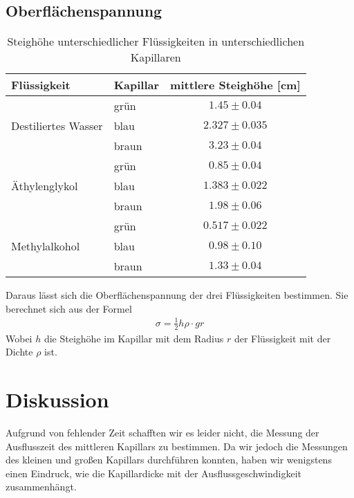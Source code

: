 \documentclass[12pt,a4paper,titlepage,headinclude,bibtotoc]{scrartcl}
\begin{document}
\subsection{Oberflächenspannung}
\begin{table}[!h]
\centering
\begin{tabular}{|l|l|c|}
\hline
Flüssigkeit 		& Kapillar & mittlere Steighöhe [cm]\\\hline\hline
			&grün	& $1.45\pm 0.04$\\
Destiliertes Wasser	&blau	& $2.327\pm 0.035$\\
                        &braun  & $3.23\pm 0.04$\\
\hline
			&grün	& $0.85\pm 0.04$\\
Äthylenglykol		&blau	& $1.383\pm 0.022$\\
			&braun	& $1.98\pm 0.06$\\
\hline
			&grün	& $0.517\pm 0.022$\\
Methylalkohol		&blau	& $0.98\pm 0.10$\\
			&braun	& $1.33\pm 0.04$\\
\hline
\end{tabular}
\caption{Steighöhe unterschiedlicher Flüssigkeiten in unterschiedlichen Kapillaren}
\end{table}
Daraus lässt sich die Oberflächenspannung der drei Flüssigkeiten bestimmen.
Sie berechnet sich aus der Formel
\begin{align}
\sigma=\frac{1}{2}h\rho\cdot g r
\end{align} 
Wobei $h$ die Steighöhe im Kapillar mit dem Radius $r$ der Flüssigkeit mit der Dichte $\rho$ ist.
\section{Diskussion}
\label{sec:diskussion}
Aufgrund von fehlender Zeit schafften wir es leider nicht, die Messung der Ausflusszeit des mittleren Kapillars zu bestimmen.
Da wir jedoch die Messungen des kleinen und großen Kapillars durchführen konnten, haben wir wenigstens einen Eindruck, wie die Kapillardicke mit der Ausflussgeschwindigkeit zusammenhängt.
\end{document}
